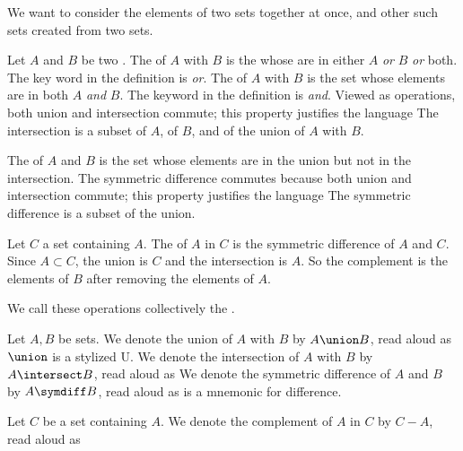 
\sbasic




\sstart



We want to consider the elements of two sets together
at once, and other such sets created from two sets.


Let $A$ and $B$ be two .
The  of $A$ with $B$ is the
 whose  are
in either $A$ \textit{or} $B$ \textit{or} both.
The key word in the definition is \textit{or}.
The  of $A$ with $B$ is
the set whose elements are in both $A$ \textit{and} $B$.
The keyword in the definition is \textit{and}.
Viewed as operations, both union and intersection commute;
this property justifies the language 
The intersection is a subset of $A$, of $B$,
and of the union of $A$ with $B$.

The 
of $A$ and $B$ is the set whose elements are in the union
but not in the intersection.
The symmetric difference commutes because both union and
intersection commute; this property justifies the
language 
The symmetric difference is a subset of the union.


Let $C$ a set containing $A$.
The  of $A$ in $C$ is
the symmetric difference of $A$ and $C$.
Since $A \subset C$, the union is $C$ and the
intersection is $A$.
So the complement is the  elements of $B$ after removing the elements of $A$.

We call these operations collectively
the .


Let $A, B$ be sets.
We denote the union of $A$ with $B$ by $A \union B$, read aloud as 
$\union$ is a stylized U.
We denote the intersection of $A$ with $B$ by $A \intersect B$, read aloud as 
We denote the symmetric difference of $A$ and $B$ by $A \symdiff B$, read aloud as 
 is a mnemonic for difference.

Let $C$ be a set containing $A$.
We denote the complement of $A$ in $C$ by $C - A$, read aloud as 


